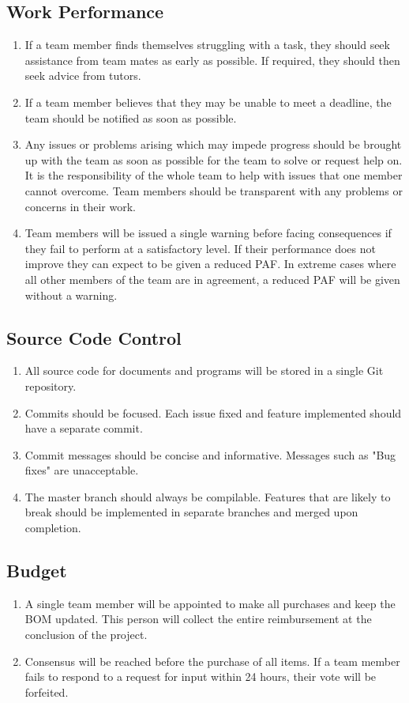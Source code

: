 \documentclass[a4paper]{article}
\begin{document}
\subsection{Work Performance}
\begin{enumerate}[label=(\alph*)]
	\item If a team member finds themselves struggling with a task, they should seek assistance from team mates as early as possible. If required, they should then seek advice from tutors.
	\item If a team member believes that they may be unable to meet a deadline, the team should be notified as soon as possible.
	\item Any issues or problems arising which may impede progress should be brought up with the team as soon as possible for the team to solve or request help on. It is the responsibility of the whole team to help with issues that one member cannot overcome. Team members should be transparent with any problems or concerns in their work.
	\item Team members will be issued a single warning before facing consequences if they fail to perform at a satisfactory level. If their performance does not improve they can expect to be given a reduced PAF. In extreme cases where all other members of the team are in agreement, a reduced PAF will be given without a warning.
\end{enumerate}

\subsection{Source Code Control}
\begin{enumerate}[label=(\alph*)]
	\item All source code for documents and programs will be stored in a single Git repository.
	\item Commits should be focused. Each issue fixed and feature implemented should have a separate commit.
	\item Commit messages should be concise and informative. Messages such as "Bug fixes" are unacceptable.
	\item The master branch should always be compilable. Features that are likely to break should  be implemented in separate branches and merged upon completion.
\end{enumerate}

\subsection{Budget}
\begin{enumerate}[label=(\alph*)]
	\item A single team member will be appointed to make all purchases and keep the BOM updated. This person will collect the entire reimbursement at the conclusion of the project.
	\item Consensus will be reached before the purchase of all items. If a team member fails to respond to a request for input within 24 hours, their vote will be forfeited.
\end{enumerate}
\end{document}
